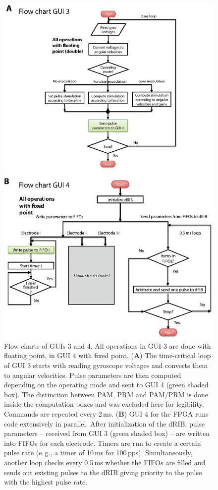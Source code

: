 \begin{figure}[btp]
\centering
\includegraphics[height=.8\textheight]{chapters/partii/crio/figures/Fig_CRIO_flowchart.eps} 
\caption[CompactRIO flow charts for GUIs 3, 4]{Flow charts of GUIs 3 and 4. All operations in GUI 3 are done with floating point, in GUI 4 with fixed point. (\textbf{A}) The time-critical loop of GUI 3 starts with reading gyroscope voltages and converts them to angular velocities. Pulse parameters are then computed depending on the operating mode and sent to GUI 4 (green shaded box). The distinction between PAM, PRM and PAM/PRM is done inside the computation boxes and was excluded here for legibility. Commands are repeated every 2\,ms. (\textbf{B}) GUI 4 for the FPGA runs code extensively in parallel. After initialization of the dRIB, pulse parameters -- received from GUI 3 (green shaded box) -- are written into FIFOs for each electrode.  Timers are run to create a certain pulse rate (e.\,g., a timer of 10\,ms for 100\,pps). Simultaneously, another loop checks every 0.5\,ms whether the FIFOs are filled and sends out existing pulses to the dRIB giving priority to the pulse with the highest pulse rate.}
\label{fig:crio:flowcharts}
\end{figure}

